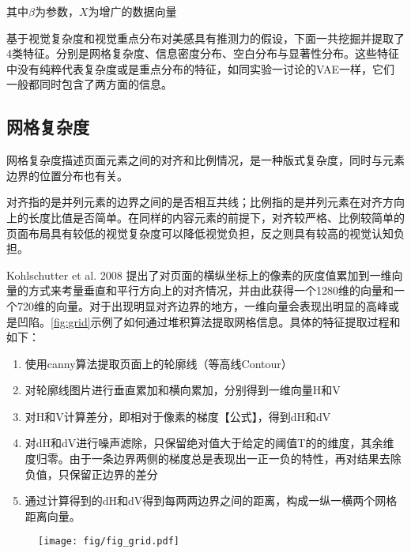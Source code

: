 其中$\beta$为参数，$X$为增广的数据向量

基于视觉复杂度和视觉重点分布对美感具有推测力的假设，下面一共挖掘并提取了4类特征。分别是网格复杂度、信息密度分布、空白分布与显著性分布。这些特征中没有纯粹代表复杂度或是重点分布的特征，如同实验一讨论的VAE一样，它们一般都同时包含了两方面的信息。

\subsection{网格复杂度}
网格复杂度描述页面元素之间的对齐和比例情况，是一种版式复杂度，同时与元素边界的位置分布也有关。

对齐指的是并列元素的边界之间的是否相互共线；比例指的是并列元素在对齐方向上的长度比值是否简单。在同样的内容元素的前提下，对齐较严格、比例较简单的页面布局具有较低的视觉复杂度可以降低视觉负担，反之则具有较高的视觉认知负担。

Kohlschutter et al. 2008 提出了对页面的横纵坐标上的像素的灰度值累加到一维向量的方式来考量垂直和平行方向上的对齐情况，并由此获得一个1280维的向量和一个720维的向量。对于出现明显对齐边界的地方，一维向量会表现出明显的高峰或是凹陷。\ref{fig:grid}示例了如何通过堆积算法提取网格信息。具体的特征提取过程和如下：
\begin{enumerate}
  \item 使用canny算法提取页面上的轮廓线（等高线Contour）
  \item 对轮廓线图片进行垂直累加和横向累加，分别得到一维向量H和V
  \item 对H和V计算差分，即相对于像素的梯度【公式】，得到dH和dV
  \item 对dH和dV进行噪声滤除，只保留绝对值大于给定的阈值T的的维度，其余维度归零。由于一条边界两侧的梯度总是表现出一正一负的特性，再对结果去除负值，只保留正边界的差分
  \item 通过计算得到的dH和dV得到每两两边界之间的距离，构成一纵一横两个网格距离向量。
\end{enumerate}

\begin{figure}[H]
  \centering
  \texttt{[image: fig/fig\_grid.pdf]}
\end{figure}

